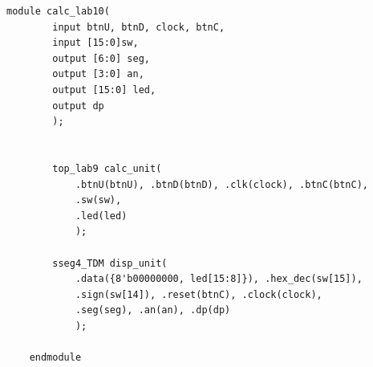 \documentclass[11pt]{article}
\begin{document}
\clearpage
\begin{lstlisting}[style=Verilog,
caption=CalcLab10,
label=MUX2 Test
]
	module calc_lab10(
		input btnU, btnD, clock, btnC,
		input [15:0]sw,
		output [6:0] seg,
		output [3:0] an,
		output [15:0] led,
		output dp
		);
	
	
		top_lab9 calc_unit(
			.btnU(btnU), .btnD(btnD), .clk(clock), .btnC(btnC),
			.sw(sw),
			.led(led)
			);
		
		sseg4_TDM disp_unit(
			.data({8'b00000000, led[15:8]}), .hex_dec(sw[15]),
			.sign(sw[14]), .reset(btnC), .clock(clock),
			.seg(seg), .an(an), .dp(dp)
			);
	
	endmodule
\end{lstlisting}
\end{document}
